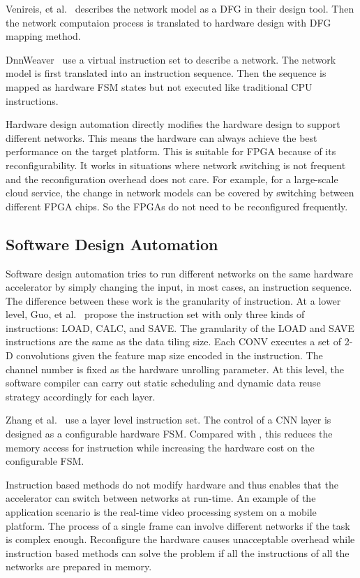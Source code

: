 Venireis, et al.~\cite{venieris2017latency} describes the network model as a DFG in their design tool. Then the network computaion process is translated to hardware design with DFG mapping method.

DnnWeaver~\cite{sharma2016high} use a virtual instruction set to describe a network. The network model is first translated into an instruction sequence. Then the sequence is mapped as hardware FSM states but not executed like traditional CPU instructions. 

Hardware design automation directly modifies the hardware design to support different networks. This means the hardware can always achieve the best performance on the target platform. This is suitable for FPGA because of its reconfigurability. It works in situations where network switching is not frequent and the reconfiguration overhead does not care. For example, for a large-scale cloud service, the change in network models can be covered by switching between different FPGA chips. So the FPGAs do not need to be reconfigured frequently.

\subsection{Software Design Automation}

Software design automation tries to run different networks on the same hardware accelerator by simply changing the input, in most cases, an instruction sequence. The difference between these work is the granularity of instruction. At a lower level, Guo, et al.~\cite{guo2017angel} propose the instruction set with only three kinds of instructions: LOAD, CALC, and SAVE. The granularity of the LOAD and SAVE instructions are the same as the data tiling size. Each CONV executes a set of 2-D convolutions given the feature map size encoded in the instruction. The channel number is fixed as the hardware unrolling parameter. At this level, the software compiler can carry out static scheduling and dynamic data reuse strategy accordingly for each layer. 

Zhang et al.~\cite{zhang2016caffeine} use a layer level instruction set. The control of a CNN layer is designed as a configurable hardware FSM. Compared with \cite{guo2017angel}, this reduces the memory access for instruction while increasing the hardware cost on the configurable FSM.

Instruction based methods do not modify hardware and thus enables that the accelerator can switch between networks at run-time. An example of the application scenario is the real-time video processing system on a mobile platform. The process of a single frame can involve different networks if the task is complex enough. Reconfigure the hardware causes unacceptable overhead while instruction based methods can solve the problem if all the instructions of all the networks are prepared in memory.

